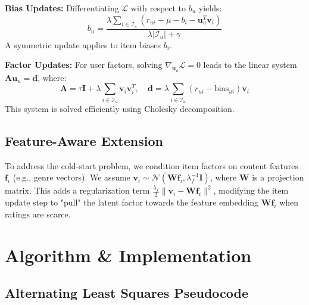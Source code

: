 \documentclass{article}
\theoremstyle{plain}
\theoremstyle{definition}
\theoremstyle{remark}
\begin{document}
\textbf{Bias Updates:} Differentiating $\mathcal{L}$ with respect to $b_u$ yields:
\begin{equation} \label{eq:bias_update}
    b_u = \frac{\lambda \sum_{i \in \mathcal{I}_u} (r_{ui} - \mu - b_i - \mathbf{u}_u^T \mathbf{v}_i)}{\lambda |\mathcal{I}_u| + \gamma}
\end{equation}
A symmetric update applies to item biases $b_i$.

\textbf{Factor Updates:} For user factors, solving $\nabla_{\mathbf{u}_u} \mathcal{L} = 0$ leads to the linear system $\mathbf{A}\mathbf{u}_u = \mathbf{d}$, where:
\begin{equation} \label{eq:factor_update}
    \mathbf{A} = \tau\mathbf{I} + \lambda \sum_{i \in \mathcal{I}_u} \mathbf{v}_i \mathbf{v}_i^T, \quad \mathbf{d} = \lambda \sum_{i \in \mathcal{I}_u} (r_{ui} - \text{bias}_{ui}) \mathbf{v}_i
\end{equation}
This system is solved efficiently using Cholesky decomposition.

\subsection{Feature-Aware Extension}
To address the cold-start problem, we condition item factors on content features $\mathbf{f}_i$ (e.g., genre vectors). We assume $\mathbf{v}_i \sim \mathcal{N}(\mathbf{W}\mathbf{f}_i, \lambda_f^{-1}\mathbf{I})$, where $\mathbf{W}$ is a projection matrix. This adds a regularization term $\frac{\lambda_f}{2} \|\mathbf{v}_i - \mathbf{W}\mathbf{f}_i\|^2$, modifying the item update step to "pull" the latent factor towards the feature embedding $\mathbf{W}\mathbf{f}_i$ when ratings are scarce.

\section{Algorithm \& Implementation} %

\subsection{Alternating Least Squares Pseudocode}
\end{document}
